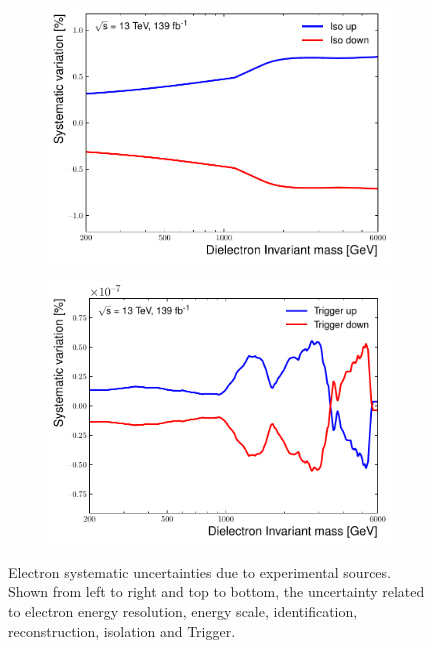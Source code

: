 \begin{figure}[]
\begin{subfigure}[b]{0.42\textwidth}
        \includegraphics[width=\textwidth]{figures/analysis/datamc/Uncertainties/exp/ee/m_ee_pstOR_EL_EFF_Iso_TOTAL_1NPCOR_PLUS_UNCOR__1up.pdf}
        \label{fig:uncert:eeIso}
    \end{subfigure}
    \begin{subfigure}[b]{0.42\textwidth}
        \centering
        \includegraphics[width=\textwidth]{figures/analysis/datamc/Uncertainties/exp/ee/m_ee_pstOR_EL_EFF_Trigger_TOTAL_1NPCOR_PLUS_UNCOR__1up.pdf}
        \label{fig:uncert:eeTrig}
    \end{subfigure}
    \caption[Electron systematic uncertainties due to experimental sources]{Electron systematic uncertainties due to experimental sources. Shown from left to right and top to bottom, the uncertainty related to electron energy resolution, energy scale, identification, reconstruction, isolation and Trigger.}
    \label{fig:uncert:eeExp}
\end{figure}

